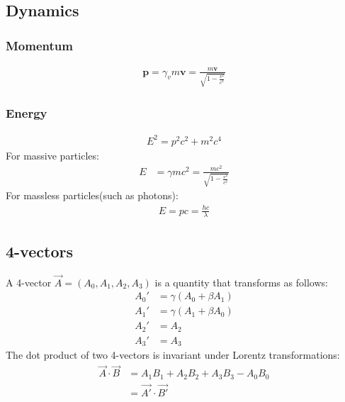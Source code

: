 \documentclass[11pt, letterpaper]{article}
\newcommand{\ve}[1]{
  \ensuremath{\bm{#1}}}	               %
\newcommand{\fve}[1]{
  \ensuremath{\vec{#1}}}               %
\begin{document}
\begin{multicols*}{3}
\subsection{Dynamics}
\subsubsection{Momentum}
\begin{align*}
  \ve{p}=\gamma_vm\ve{v}=\frac{m\ve{v}}{\sqrt{1-\frac{v^2}{c^2}}}
\end{align*}
\subsubsection{Energy}
\begin{align*}
  E^2=p^2c^2+m^2c^4
\end{align*}
For massive particles:
\begin{align*}
  E&=\gamma mc^2=\frac{mc^2}{\sqrt{1-\frac{v^2}{c^2}}}
\end{align*}
For massless particles(such as photons):
\begin{align*}
  E=pc=\frac{hc}{\lambda}
\end{align*}
\subsection{4-vectors}
A 4-vector $\fve{A}=(A_0,A_1,A_2,A_3)$ is a quantity that transforms as follows:
\begin{align*}
  A_0'&= \gamma(A_0+\beta A_1)\\
  A_1'&= \gamma(A_1+\beta A_0)\\
  A_2'&= A_2\\
  A_3'&= A_3
\end{align*}
The dot product of two 4-vectors is invariant under Lorentz transformations:
\begin{align*}
  \fve{A}\cdot\fve{B} &= A_1B_1 + A_2B_2 + A_3B_3 - A_0B_0\\
  &= \fve{A'}\cdot\fve{B'}
\end{align*}

\end{multicols*}
\end{document}

